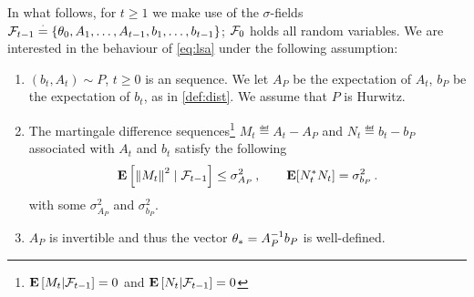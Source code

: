 In what follows, for $t\ge1$ we make use of the $\sigma$-fields $\mathcal{F}_{t-1}\stackrel{\cdot}{=}\{\theta_0,A_1,\ldots, A_{t-1}, b_1,\ldots, b_{t-1}\}$; $\mathcal{F}_0$ holds all random variables. 
We are interested in the behaviour of \eqref{eq:lsa} under the following assumption:
\begin{assumption}\label{assmp:lsa}
\begin{enumerate}[leftmargin=*, before = \leavevmode\vspace{-\baselineskip}]
\item \label{dist} $(b_t, A_t)\sim P$, $t\geq 0$ is an \iid sequence.
We let $A_P$ be the expectation of $A_t$, $b_P$ be the expectation of $b_t$, as in \cref{def:dist}.
We assume that $P$ is Hurwitz.
\item \label{matvar} The martingale difference sequences\footnote{$\mathbf{E}\left[M_t|\mathcal{F}_{t-1}\right]=0$ and $\mathbf{E}\left[N_t|\mathcal{F}_{t-1}\right]=0$} $M_t\eqdef A_t-A_{P}$ and $N_t\eqdef b_t-b_{P}$ associated with $A_t$ and $b_t$ satisfy the following 
\begin{align*}
	\mathbf{E}\left[ \left\| M_t\right\|^2\mid\mathcal{F}_{t-1}\right]\leq \sigma^2_{A_P}\,, \qquad 
	\mathbf{E}[N_t^* N_t]=\sigma^2_{b_P}\,.
\end{align*}
with some $\sigma^2_{A_P}$ and $\sigma^2_{b_P}$. 
\item $A_P$ is invertible and thus the vector $\theta_*=A^{-1}_Pb_P$ is well-defined. 
\end{enumerate}
\end{assumption}
